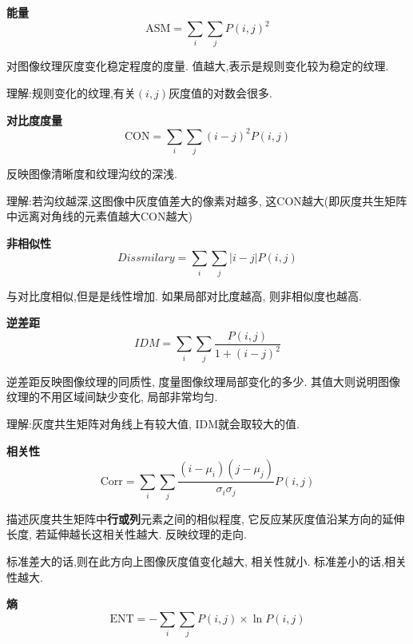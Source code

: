 \noindent{}\textbf{\color{magenta}能量}
\begin{equation}
  \text{ASM} = \sum_{i}{\sum_{j}P(i,j)^{2}}
\end{equation}

对图像纹理灰度变化稳定程度的度量.%
值越大,表示是规则变化较为稳定的纹理.

理解:规则变化的纹理,有关$(i,j)$灰度值的对数会很多.

\noindent{}\textbf{\color{magenta}对比度度量}
\begin{equation}
  \text{CON} = \sum_{i}{\sum_{j}(i-j)^{2}P(i,j)}
\end{equation}

反映图像清晰度和纹理沟纹的深浅.

理解:若沟纹越深,这图像中灰度值差大的像素对越多,%
这CON越大(即灰度共生矩阵中远离对角线的元素值越大CON越大)

\noindent{}\textbf{\color{magenta}非相似性}
\begin{equation}
  Dissmilary = \sum_{i}{\sum_{j}|i-j|P(i,j)}
\end{equation}

与对比度相似,但是是线性增加.%
如果局部对比度越高,%
则非相似度也越高.

\noindent{}\textbf{\color{magenta}逆差距}
\begin{equation}
  IDM = \sum_{i}{\sum_{j}\frac{P(i,j)}{1+(i-j)^2}}
\end{equation}

逆差距反映图像纹理的同质性,%
度量图像纹理局部变化的多少.%
其值大则说明图像纹理的不用区域间缺少变化,%
局部非常均匀.

理解:灰度共生矩阵对角线上有较大值,%
IDM就会取较大的值.

\noindent{}\textbf{\color{magenta}相关性}
\begin{equation}
  \text{Corr} = \sum_{i}{\sum_{j}\frac{(i-\mu_{i})(j-\mu_{j})}{\sigma_{i}\sigma_{j}}P(i,j)}
\end{equation}

描述灰度共生矩阵中\textbf{\color{magenta}行或列}元素之间的相似程度,%
它反应某灰度值沿某方向的延伸长度,%
若延伸越长这相关性越大.%
反映纹理的走向.

标准差大的话,则在此方向上图像灰度值变化越大,%
相关性就小.%
标准差小的话,相关性越大.

\noindent{}\textbf{\color{magenta}熵}
\begin{equation}
  \text{ENT} = -\sum_{i}{\sum_{j}P(i,j) \times \ln P(i,j)}
\end{equation}

